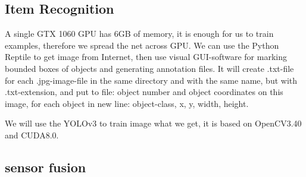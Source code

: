 \subsection{Item Recognition}

A single GTX 1060 GPU has 6GB of memory, it is enough for us to train examples, therefore we spread the net across GPU.
We can use the Python Reptile to get image from Internet, then use visual GUI-software for marking bounded boxes of objects and generating annotation files.
It will create .txt-file for each .jpg-image-file in the same directory and with the same name, but with .txt-extension, and put to file: object number and object coordinates on this image, for each object in new line: object-class, x, y, width, height.

We will use the YOLOv3 to train image what we get, it is based on OpenCV3.40 and CUDA8.0.

\subsection{sensor fusion}
